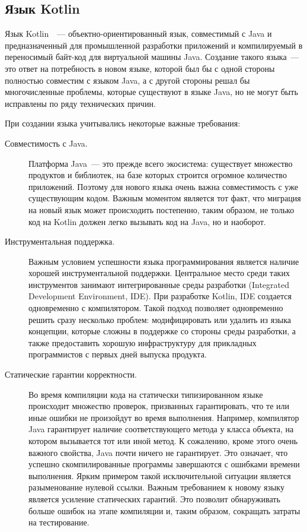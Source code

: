 \subsection{Язык Kotlin}\label{kotlin-desc}
Язык Kotlin~\cite{breslav2011}~--- объектно-ориентированный язык, совместимый с Java и предназначенный для промышленной разработки приложений и компилируемый в переносимый байт-код для виртуальной машины Java. Создание такого языка~--- это ответ на потребность в новом языке, которой был бы с одной стороны полностью совместим с языком Java, а с другой стороны решал бы многочисленные проблемы, которые существуют в языке Java, но не могут быть исправлены по ряду технических причин.

При создании языка учитывались некоторые важные требования: %
\begin{description}
	\item[Совместимость с Java.] Платформа Java~--- это прежде всего экосистема: существует множество продуктов и библиотек, на базе которых строится огромное количество приложений.
	Поэтому для нового языка очень важна совместимость с уже существующим кодом. Важным моментом является тот факт, что миграция на новый язык может происходить постепенно, таким образом, не только код на Kotlin должен легко вызывать код на Java, но и наоборот.

	\item[Инструментальная поддержка.] Важным условием успешности языка программирования является наличие хорошей инструментальной поддержки. Центральное место среди таких инструментов занимают интегрированные среды разработки (Integrated Development Environment, IDE).
	При разработке Kotlin, IDE создается одновременно с компилятором. Такой подход позволяет одновременно решить сразу несколько проблем: модифицировать или удалить из языка концепции, которые сложны в поддержке со стороны среды разработки, а также предоставить хорошую инфраструктуру для прикладных программистов с первых дней выпуска продукта.

	\item[Статические гарантии корректности.] Во время компиляции кода на статически типизированном языке происходит множество проверок, призванных гарантировать, что те или иные ошибки не произойдут во время выполнения. Например, компилятор Java гарантирует наличие соответствующего метода у класса объекта, на котором вызывается тот или иной метод. К сожалению, кроме этого очень важного свойства, Java почти ничего не гарантирует. Это означает, что успешно скомпилированные программы завершаются с ошибками времени выполнения. Ярким примером такой исключительной ситуации является разыменование нулевой ссылки. Важным требованием к новому языку является усиление статических гарантий. Это позволит обнаруживать больше ошибок на этапе компиляции и, таким образом, сокращать затраты на тестирование.


\end{description}
